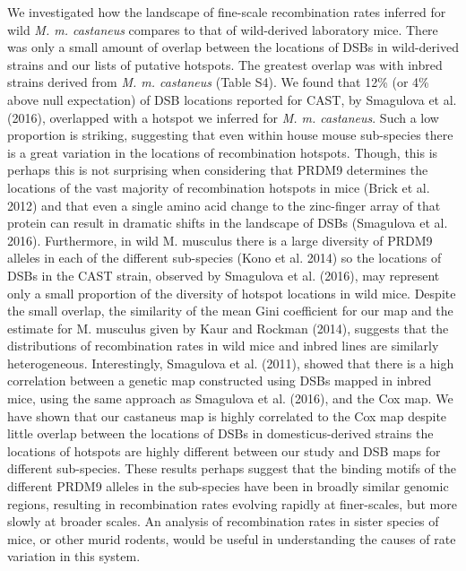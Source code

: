 We investigated how the landscape of fine-scale recombination rates inferred for wild \emph{M. m. castaneus} compares to that of wild-derived laboratory mice. There was only a small amount of overlap between the locations of DSBs in wild-derived strains and our lists of putative hotspots. The greatest overlap was with inbred strains derived from \emph{M. m. castaneus} (Table S4). We found that 12\% (or 4\% above null expectation) of DSB locations reported for CAST, by Smagulova et al. (2016), overlapped with a hotspot we inferred for \emph{M. m. castaneus}. Such a low proportion is striking, suggesting that even within house mouse sub-species there is a great variation in the locations of recombination hotspots. Though, this is perhaps this is not surprising when considering that PRDM9 determines the locations of the vast majority of recombination hotspots in mice (Brick et al. 2012) and that even a single amino acid change to the zinc-finger array of that protein can result in dramatic shifts in the landscape of DSBs (Smagulova et al. 2016). Furthermore, in wild M. musculus there is a large diversity of PRDM9 alleles in each of the different sub-species (Kono et al. 2014) so the locations of DSBs in the CAST strain, observed by Smagulova et al. (2016), may represent only a small proportion of the diversity of hotspot locations in wild mice. Despite the small overlap, the similarity of the mean Gini coefficient for our map and the estimate for M. musculus given by Kaur and Rockman (2014), suggests that the distributions of recombination rates in wild mice and inbred lines are similarly heterogeneous. Interestingly, Smagulova et al. (2011), showed that there is a high correlation between a genetic map constructed using DSBs mapped in inbred mice, using the same approach as Smagulova et al. (2016), and the Cox map. We have shown that our castaneus map is highly correlated to the Cox map despite little overlap between the locations of DSBs in domesticus-derived strains the locations of hotspots are highly different between our study and DSB maps for different sub-species. These results perhaps suggest that the binding motifs of the different PRDM9 alleles in the sub-species have been in broadly similar genomic regions, resulting in recombination rates evolving rapidly at finer-scales, but more slowly at broader scales. An analysis of recombination rates in sister species of mice, or other murid rodents, would be useful in understanding the causes of rate variation in this system.

